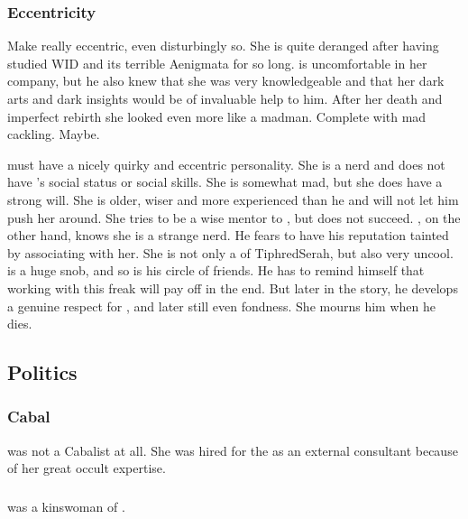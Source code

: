 \subsubsection{Eccentricity}
Make \Urizeth really eccentric, even disturbingly so.
She is quite deranged after having studied WID and its terrible Aenigmata for so long.
\Teshrial is uncomfortable in her company, but he also knew that she was very knowledgeable and that her dark arts and dark insights would be of invaluable help to him.
After her death and imperfect rebirth she looked even more like a madman. 
Complete with mad cackling.
Maybe.

\Urizeth must have a nicely quirky and eccentric personality.
She is a nerd and does not have \Teshrial's social status or social skills.
She is somewhat mad, but she does have a strong will. 
She is older, wiser and more experienced than he and will not let him push her around.
She tries to be a wise mentor to \Teshrial, but does not succeed.
\Teshrial, on the other hand, knows she is a strange nerd.
He fears to have his reputation tainted by associating with her.
She is not only a \thelyad of TiphredSerah, but also very uncool.
\Teshrial is a huge snob, and so is his circle of friends.
He has to remind himself that working with this freak will pay off in the end.
But later in the story, he develops a genuine respect for \Urizeth, and later still even fondness.
She mourns him when he dies.









\subsection{Politics}





\subsubsection{Cabal}
\Urizeth was not a Cabalist at all. 
She was hired for the  as an external consultant because of her great occult expertise. 





\subsubsection{\Ganethed}
\Urizeth was a kinswoman of .















